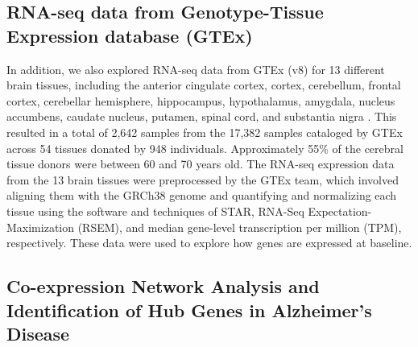 \documentclass[utf8]{FrontiersinHarvard} %
\begin{document}
\subsection{RNA-seq data from Genotype-Tissue Expression database (GTEx)}

In addition, we also explored RNA-seq data from GTEx (v8) for 13 different brain tissues, including the anterior cingulate cortex, cortex, cerebellum, frontal cortex, cerebellar hemisphere, hippocampus, hypothalamus, amygdala, nucleus accumbens, caudate nucleus, putamen, spinal cord, and substantia nigra \citep{lonsdale2013genotype}. This resulted in a total of 2,642 samples from the 17,382 samples cataloged by GTEx across 54 tissues donated by 948 individuals. Approximately 55\% of the cerebral tissue donors were between 60 and 70 years old. The RNA-seq expression data from the 13 brain tissues were preprocessed by the GTEx team, which involved aligning them with the GRCh38 genome and quantifying and normalizing each tissue using the software and techniques of STAR, RNA-Seq Expectation-Maximization (RSEM), and median gene-level transcription per million (TPM), respectively. These data were used to explore how genes are expressed at baseline.

\subsection{Co-expression Network Analysis and Identification of Hub Genes in Alzheimer's Disease}
\end{document}
